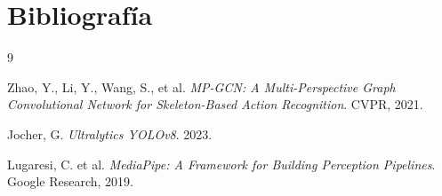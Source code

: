 \documentclass{article}
\begin{document}
\section{Bibliografía}

\begin{thebibliography}{9}

Zhao, Y., Li, Y., Wang, S., et al.  
\textit{MP-GCN: A Multi-Perspective Graph Convolutional Network for Skeleton-Based Action Recognition}. CVPR, 2021.

Jocher, G.  
\textit{Ultralytics YOLOv8}. 2023.

Lugaresi, C. et al.  
\textit{MediaPipe: A Framework for Building Perception Pipelines}. Google Research, 2019.

\end{thebibliography}
\end{document}
